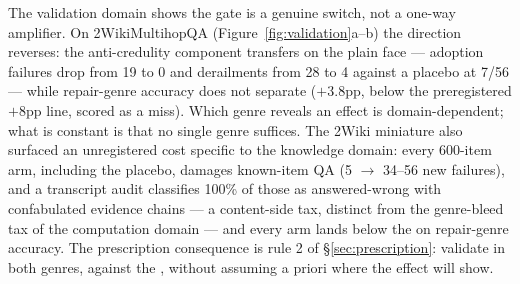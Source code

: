 The validation domain shows the gate is a genuine switch, not a one-way
amplifier. On 2WikiMultihopQA (Figure~\ref{fig:validation}a--b) the direction
reverses: the anti-credulity component transfers on the plain face --- adoption
failures drop from 19 to 0 and derailments from 28 to 4 against a placebo at
7/56 --- while repair-genre accuracy does not separate ($+3.8$pp, below the
preregistered $+8$pp line, scored as a miss). Which genre reveals an effect is
domain-dependent; what is constant is that no single genre suffices. The 2Wiki
miniature also surfaced an unregistered cost specific to the knowledge domain:
every 600-item arm, including the placebo, damages known-item QA (5
$\rightarrow$ 34--56 new failures), and a transcript audit classifies 100\% of
those as answered-wrong with confabulated evidence chains --- a content-side
tax, distinct from the genre-bleed tax of the computation domain --- and every
arm lands below the \prerepair{} on repair-genre accuracy. The prescription
consequence is rule 2 of \S\ref{sec:prescription}: validate in both genres,
against the \prerepair{}, without assuming a priori where the effect will show.
